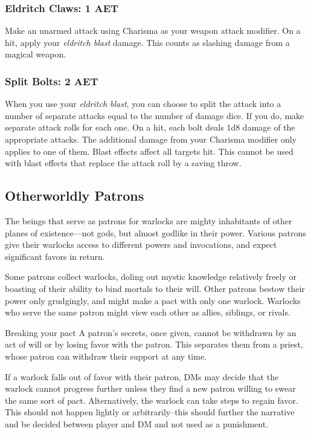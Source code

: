 \subsubsection{Eldritch Claws: 1 AET}
Make an unarmed attack using Charisma as your weapon attack modifier. On a hit, apply your \textit{eldritch blast} damage. This counts as slashing damage from a magical weapon.

\subsubsection{Split Bolts: 2 AET}
When you use your \textit{eldritch blast}, you can choose to split the attack into a number of separate attacks equal to the number of damage dice. If you do, make separate attack rolls for each one. On a hit, each bolt deals 1d8 damage of the appropriate attacks. The additional damage from your Charisma modifier only applies to one of them. Blast effects affect all targets hit. This cannot be used with blast effects that replace the attack roll by a saving throw.

\subsection{Otherworldly Patrons}

The beings that serve as patrons for warlocks are mighty inhabitants of other planes of existence—not gods, but almost godlike in their power. Various patrons give their warlocks access to different powers and invocations, and expect significant favors in return.

Some patrons collect warlocks, doling out mystic knowledge relatively freely or boasting of their ability to bind mortals to their will. Other patrons bestow their power only grudgingly, and might make a pact with only one warlock. Warlocks who serve the same patron might view each other as allies, siblings, or rivals.

\begin{DndComment}{Breaking your pact}
	A patron's secrets, once given, cannot be withdrawn by an act of will or by losing favor with the patron. This separates them from a priest, whose patron can withdraw their support at any time.

	If a warlock falls out of favor with their patron, DMs may decide that the warlock cannot progress further unless they find a new patron willing to swear the same sort of pact. Alternatively, the warlock can take steps to regain favor. This should not happen lightly or arbitrarily--this should further the narrative and be decided between player and DM and not used as a punishment.
\end{DndComment}

